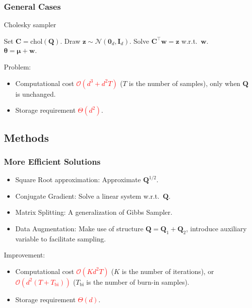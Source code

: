\documentclass[aspectratio=169]{beamer}
\newcommand{\B}[1]{\mathbf{#1}} %
\newcommand{\Bs}[1]{\boldsymbol{#1}} %
\begin{document}
\begin{frame}
\frametitle{General Cases}
\begin{algorithm}[H]
\caption{Cholesky sampler}
\begin{algorithmic}[1]
\State Set $\B{C} = \text{chol}(\B{Q})$.
\Comment{\textcolor{blue}{$\B{Q} = \B{C}\B{C}^{\top}$}}
\State Draw $\B{z} \sim \mathcal{N}(\B{0}_d,\B{I}_d)$.
\State Solve $\B{C}^{\top}\B{w} = \B{z}$ w.r.t.\ $\B{w}$.\\
\Return $\Bs{\theta} = \Bs{\mu} + \B{w}$.
\end{algorithmic}
\end{algorithm}
Problem: 
\begin{itemize}
\item Computational cost \textcolor{red}{\(\mathcal{O}(d^3 + d^2T)\)} (\(T\) is the number of samples), only when \(\B{Q}\) is unchanged.
\item Storage requirement \textcolor{red}{\(\Theta(d^2)\)}.
\end{itemize}
\end{frame}

\subsection{Methods}
\begin{frame}
\frametitle{More Efficient Solutions}
\begin{itemize}
    \item Square Root approximation: Approximate \(\B{Q}^{1/2}\).
    \item Conjugate Gradient: Solve a linear system w.r.t.\ \(\B{Q}\).
    \item Matrix Splitting: A generalization of Gibbs Sampler.
    \item Data Augmentation: Make use of structure \(\B{Q}= \B{Q}_1 + \B{Q}_2\), introduce auxiliary variable to facilitate sampling.
\end{itemize}
Improvement: 
\begin{itemize}
\item Computational cost \textcolor{red}{$\mathcal{O}(Kd^2T)$} (\(K\) is the number of iterations), or \textcolor{red}{$\mathcal{O}(d^2(T+T_\text{bi}))$} (\(T_\text{bi}\) is the number of burn-in samples).
\item Storage requirement \textcolor{red}{\(\Theta(d)\)}.
\end{itemize}
\end{frame}
\end{document}
